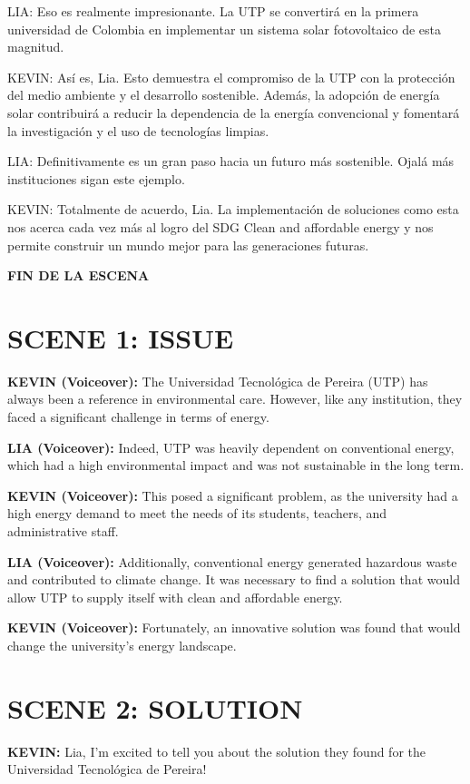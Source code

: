 \documentclass{article}
\begin{document}
LIA: Eso es realmente impresionante. La UTP se convertirá en la primera universidad de Colombia en implementar un sistema solar fotovoltaico de esta magnitud.

KEVIN: Así es, Lia. Esto demuestra el compromiso de la UTP con la protección del medio ambiente y el desarrollo sostenible. Además, la adopción de energía solar contribuirá a reducir la dependencia de la energía convencional y fomentará la investigación y el uso de tecnologías limpias.

LIA: Definitivamente es un gran paso hacia un futuro más sostenible. Ojalá más instituciones sigan este ejemplo.

KEVIN: Totalmente de acuerdo, Lia. La implementación de soluciones como esta nos acerca cada vez más al logro del SDG Clean and affordable energy y nos permite construir un mundo mejor para las generaciones futuras.

\textbf{FIN DE LA ESCENA}

\section*{SCENE 1: ISSUE}

\textbf{KEVIN (Voiceover):} The Universidad Tecnológica de Pereira (UTP) has always been a reference in environmental care. However, like any institution, they faced a significant challenge in terms of energy.

\textbf{LIA (Voiceover):} Indeed, UTP was heavily dependent on conventional energy, which had a high environmental impact and was not sustainable in the long term.

\textbf{KEVIN (Voiceover):} This posed a significant problem, as the university had a high energy demand to meet the needs of its students, teachers, and administrative staff.

\textbf{LIA (Voiceover):} Additionally, conventional energy generated hazardous waste and contributed to climate change. It was necessary to find a solution that would allow UTP to supply itself with clean and affordable energy.

\textbf{KEVIN (Voiceover):} Fortunately, an innovative solution was found that would change the university's energy landscape.

\section*{SCENE 2: SOLUTION}

\textbf{KEVIN:} Lia, I'm excited to tell you about the solution they found for the Universidad Tecnológica de Pereira!
\end{document}
